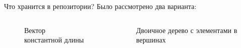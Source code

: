 \begin{frame}[fragile]{Что хранится в репозитории?}
  Было рассмотрено два варианта:

  \begin{columns}[b]
    \begin{column}{0.45\textwidth}
      \begin{figure}
        \centering
        \caption{Вектор константной длины}
      \end{figure}
    \end{column}
    
    \begin{column}{0.45\textwidth}
      \begin{figure}
        \centering
        \caption{Двоичное дерево с элементами в вершинах}
      \end{figure}
    \end{column}
  \end{columns}

\end{frame}
